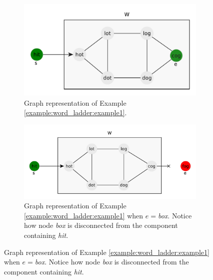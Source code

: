 \begin{figure}
	\centering
	\begin{subfigure}[]{0.95\textwidth}
		\includegraphics[width=\textwidth]{sources/word_ladder/images/example1}
		\caption[n]{Graph representation of Example \ref{example:word_ladder:example1}.}
		\label{fig:word_ladder:example1}
	 \end{subfigure}
	\hfill
	\begin{subfigure}[]{1.17\textwidth}
		\includegraphics[width=\textwidth]{sources/word_ladder/images/example2}
		\caption[n]{Graph representation of Example \ref{example:word_ladder:example1} when $e=$\textit{box}. Notice how node \textit{box} is disconnected from the component containing \textit{hit}.}
		\label{fig:word_ladder:example1}
	\end{subfigure}
\end{figure}
    


\begin{minipage}{\linewidth}
	
\end{minipage}

